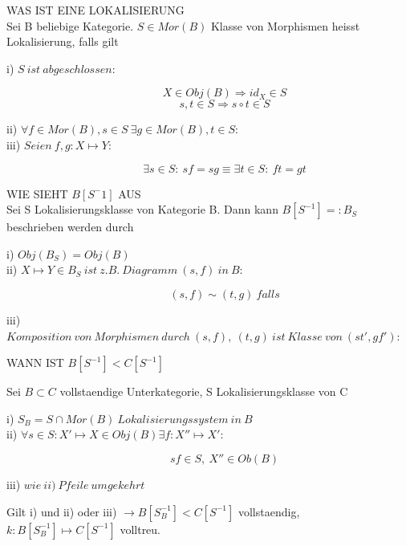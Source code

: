 \documentclass[12pt]{article}
\begin{document}
\newpage

 WAS IST EINE LOKALISIERUNG\\

{\large Sei B beliebige Kategorie. $S \in Mor(B)$ Klasse von Morphismen heisst Lokalisierung, falls gilt}
\begin{description}
    \item[i) $S \: ist \: abgeschlossen$:]
        \[X \in Obj(B) \Rightarrow id_X \in S\]
        \[s,t \in S \Rightarrow s \circ t \in S\]
    \item[ii) $\forall f \in Mor(B), s \in S \: \exists g \in Mor(B), t \in S$:]
    \item[iii) $Seien \: f,g : X \mapsto Y$:]
        \[\exists s \in S: \: sf = sg \equiv \exists t \in S: \: ft = gt\]
\end{description}

WIE SIEHT $B[S^-1]$ AUS\\

{\large Sei S Lokalisierungsklasse von Kategorie B. Dann kann $B[S^{-1}] =: B_S$ beschrieben werden durch}
\begin{description}
    \item[i) $Obj(B_S) = Obj(B)$]
    \item[ii) $X \mapsto Y \in B_S \: ist \: z.B. \: Diagramm \: (s,f) \: in \: B$:]
        \[(s,f) \sim (t, g) \: falls\]
    \item[iii) $Komposition \: von \: Morphismen \: durch \: (s,f), \: (t,g) \: ist \: Klasse \: von \: (st',gf')$:]
\end{description}

WANN IST $B[S^{-1}] < C[S^{-1}]$

 {\large Sei $B \subset C$ vollstaendige Unterkategorie, S Lokalisierungsklasse von C}
\begin{description}
    \item[i) $S_B = S \cap Mor(B) \: Lokalisierungssystem \: in \: B$]
    \item[ii) $\forall s \in S : X' \mapsto X \in Obj(B) \exists f : X'' \mapsto X'$:]
        \[sf \in S, \: X'' \in Ob(B)\]
    \item[iii) $wie \: ii) \: Pfeile \: umgekehrt$]   
\end{description}
Gilt i) und ii) oder iii) $\rightarrow B[S_B^{-1}] < C[S^{-1}]$ vollstaendig, $k : B[S_B^{-1}] \mapsto C[S^{-1}]$ volltreu. 
\end{document}
